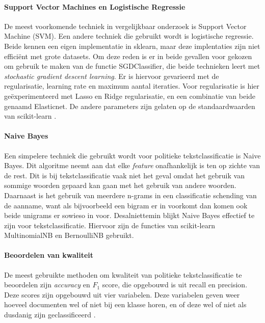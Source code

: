 \paragraph{Support Vector Machines en Logistische Regressie}
De meest voorkomende techniek in vergelijkbaar onderzoek is Support Vector Machine (SVM). Een andere techniek die gebruikt wordt is logistische regressie. Beide kennen een eigen implementatie in sklearn, maar deze implentaties zijn niet efficiënt met grote datasets. Om deze reden is er in beide gevallen voor gekozen om gebruik te maken van de functie SGDClassifier, die beide technieken leert met \textit{stochastic gradient descent learning}. Er is hiervoor gevarieerd met de regularisatie, learning rate en maximum aantal iteraties. Voor regularisatie is hier geëxperimenteerd met Lasso en Ridge regularisatie, en een combinatie van beide genaamd Elasticnet. De andere parameters zijn gelaten op de standaardwaarden van scikit-learn \cite{scikit-learn}.\par

\paragraph{Naive Bayes}
Een simpelere techniek die gebruikt wordt voor politieke tekstclassificatie is Naive Bayes. Dit algoritme neemt aan dat elke \textit{feature} onafhankelijk is ten op zichte van de rest. Dit is bij tekstclassificatie vaak niet het geval omdat het gebruik van sommige woorden gepaard kan gaan met het gebruik van andere woorden. Daarnaast is het gebruik van meerdere n-grams in een classificatie schending van de aanname, want als bijvoorbeeld een bigram er in voorkomt dan komen ook beide unigrams er sowieso in voor. Desalniettemin blijkt Naive Bayes effectief te zijn voor tekstclassificatie\cite{scikit-learn,bhand}. Hiervoor zijn de functies van scikit-learn MultinomialNB en BernoulliNB gebruikt.\cite{scikit-learn,bhand}\par

\paragraph{Beoordelen van kwaliteit}
De meest gebruikte methoden om kwaliteit van politieke tekstclassificatie te beoordelen zijn \textit{accuracy} en $F_1$ score, die opgebouwd is uit recall en precision. Deze scores zijn opgebouwd uit vier variabelen. Deze variabelen geven weer hoeveel documenten wel of niet bij een klasse horen, en of deze wel of niet als dusdanig zijn geclassificeerd \cite{Manning:2008:IIR:1394399} .\par

